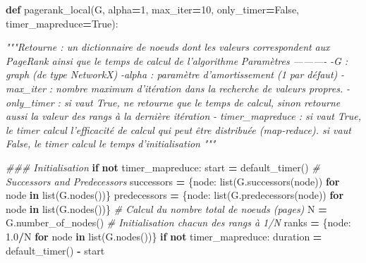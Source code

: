 \documentclass[10pt,a4paper]{article}
\newenvironment{Shaded}{\begin{snugshade}}{\end{snugshade}}
\newcommand{\BuiltInTok}[1]{#1}
\newcommand{\CommentTok}[1]{\textcolor[rgb]{0.56,0.35,0.01}{\textit{#1}}}
\newcommand{\ControlFlowTok}[1]{\textcolor[rgb]{0.13,0.29,0.53}{\textbf{#1}}}
\newcommand{\DecValTok}[1]{\textcolor[rgb]{0.00,0.00,0.81}{#1}}
\newcommand{\FloatTok}[1]{\textcolor[rgb]{0.00,0.00,0.81}{#1}}
\newcommand{\KeywordTok}[1]{\textcolor[rgb]{0.13,0.29,0.53}{\textbf{#1}}}
\newcommand{\NormalTok}[1]{#1}
\newcommand{\OperatorTok}[1]{\textcolor[rgb]{0.81,0.36,0.00}{\textbf{#1}}}
\newcommand{\VariableTok}[1]{\textcolor[rgb]{0.00,0.00,0.00}{#1}}
\theoremstyle{break}
\begin{document}
\begin{Shaded}
\begin{Highlighting}[]
\KeywordTok{def}\NormalTok{ pagerank_local(G, alpha}\OperatorTok{=}\DecValTok{1}\NormalTok{, max_iter}\OperatorTok{=}\DecValTok{10}\NormalTok{,}
\NormalTok{                   only_timer}\OperatorTok{=}\VariableTok{False}\NormalTok{, timer_mapreduce}\OperatorTok{=}\VariableTok{True}\NormalTok{):  }

    \CommentTok{"""Retourne : un dictionnaire de noeuds dont les valeurs correspondent}
\CommentTok{     aux PageRank ainsi que le temps de calcul de l'algorithme}
\CommentTok{      }
\CommentTok{    Paramètres}
\CommentTok{    ---------- }
\CommentTok{    -G : graph (de type NetworkX) }
\CommentTok{    -alpha : paramètre d'amortissement (1 par défaut) }
\CommentTok{    -max_iter : nombre maximum d'itération dans la recherche de valeurs propres. }
\CommentTok{    - only_timer : si vaut True, ne retourne que le temps de calcul, sinon retourne }
\CommentTok{    aussi la valeur des rangs à la dernière itération }
\CommentTok{    - timer_mapreduce : si vaut True, le timer calcul l'efficacité de calcul qui peut}
\CommentTok{    être distribuée (map-reduce). si vaut False, le timer calcul le temps}
\CommentTok{    d'initialisation}
\CommentTok{    }
\CommentTok{    """}
    
    \CommentTok{### Initialisation}
    \ControlFlowTok{if} \KeywordTok{not}\NormalTok{ timer_mapreduce:}
\NormalTok{            start }\OperatorTok{=}\NormalTok{ default_timer()}
    \CommentTok{# Successors and Predecessors}
\NormalTok{    successors }\OperatorTok{=}\NormalTok{ \{node: }\BuiltInTok{list}\NormalTok{(G.successors(node)) }\ControlFlowTok{for}\NormalTok{ node }\KeywordTok{in} \BuiltInTok{list}\NormalTok{(G.nodes())\} }
\NormalTok{    predecessors }\OperatorTok{=}\NormalTok{ \{node: }\BuiltInTok{list}\NormalTok{(G.predecessors(node)) }\ControlFlowTok{for}\NormalTok{ node }\KeywordTok{in} \BuiltInTok{list}\NormalTok{(G.nodes())\}}
    \CommentTok{# Calcul du nombre total de noeuds (pages)}
\NormalTok{    N }\OperatorTok{=}\NormalTok{ G.number_of_nodes() }
    \CommentTok{# Initialisation chacun des rangs à 1/N}
\NormalTok{    ranks }\OperatorTok{=}\NormalTok{ \{node: }\FloatTok{1.0}\OperatorTok{/}\NormalTok{N }\ControlFlowTok{for}\NormalTok{ node }\KeywordTok{in} \BuiltInTok{list}\NormalTok{(G.nodes())\} }
    \ControlFlowTok{if} \KeywordTok{not}\NormalTok{ timer_mapreduce:}
\NormalTok{            duration }\OperatorTok{=}\NormalTok{ default_timer() }\OperatorTok{-}\NormalTok{ start}
    

\end{Highlighting}
\end{Shaded}
\end{document}
